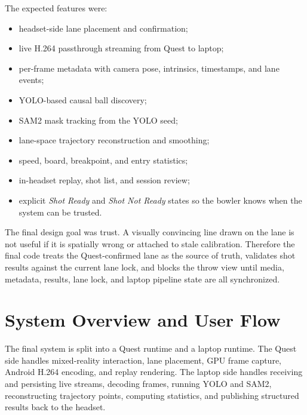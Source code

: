 \documentclass[11pt]{article}
\begin{document}
The expected features were:
\begin{itemize}
  \item headset-side lane placement and confirmation;
  \item live H.264 passthrough streaming from Quest to laptop;
  \item per-frame metadata with camera pose, intrinsics, timestamps, and lane events;
  \item YOLO-based causal ball discovery;
  \item SAM2 mask tracking from the YOLO seed;
  \item lane-space trajectory reconstruction and smoothing;
  \item speed, board, breakpoint, and entry statistics;
  \item in-headset replay, shot list, and session review;
  \item explicit \emph{Shot Ready} and \emph{Shot Not Ready} states so the bowler knows when the system can be trusted.
\end{itemize}

The final design goal was trust. A visually convincing line drawn on the lane is not useful if it is spatially wrong or attached to stale calibration. Therefore the final code treats the Quest-confirmed lane as the source of truth, validates shot results against the current lane lock, and blocks the throw view until media, metadata, results, lane lock, and laptop pipeline state are all synchronized.

\section{System Overview and User Flow}

The final system is split into a Quest runtime and a laptop runtime. The Quest side handles mixed-reality interaction, lane placement, GPU frame capture, Android H.264 encoding, and replay rendering. The laptop side handles receiving and persisting live streams, decoding frames, running YOLO and SAM2, reconstructing trajectory points, computing statistics, and publishing structured results back to the headset.
\end{document}
